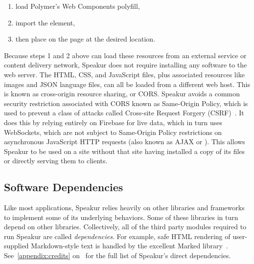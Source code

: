 \begin{enumerate}
\item load Polymer's Web Components polyfill,
\item import the  element,
\item then place  on the page at the desired location. 
\end{enumerate}

Because steps 1 and 2 above can load these resources from an external service or content delivery network,
Speakur does not require installing any software to the web server.
The HTML, CSS, and JavaScript files, plus associated resources like images and JSON language files, 
can all be loaded from a different web host. 
This is known as cross-origin resource sharing, or CORS.
Speakur avoids a common security restriction associated with CORS known as Same-Origin Policy, which is used to prevent a class of attacks called Cross-site Request Forgery (CSRF)~\cite{mozillacontributors2015-b}.
It does this by relying entirely on Firebase for live data,
which in turn uses WebSockets,
which are not subject to Same-Origin Policy restrictions on asynchronous JavaScript HTTP requests (also known as AJAX or ).
This allows Speakur to be used on a site without that site having installed a copy of its files or directly serving them to clients.

\subsection{Software Dependencies}
\label{sec:dependencies}
Like most applications, Speakur relies heavily on other libraries and frameworks to implement some of its underlying behaviors. 
Some of these libraries in turn depend on other libraries.
Collectively, all of the third party modules required to run Speakur are called \textit{dependencies}.
For example, safe HTML rendering of user-supplied Markdown-style text is handled by the excellent Marked library~\cite{christopherjeffrey2014}.
See~\cref{appendix:credits} on~ for the full list of Speakur's direct dependencies.

